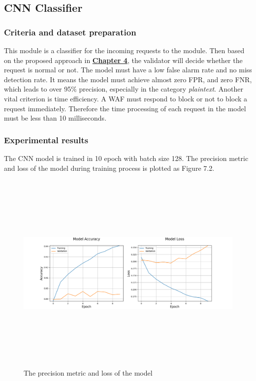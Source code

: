 \subsection{CNN Classifier}
\subsubsection{Criteria and dataset preparation}
\hspace{0.5cm}This module is a classifier for the incoming requests to the module. Then based on the proposed approach in \hyperref[chap:proposed_approaches]{\textbf{Chapter 4}}, the validator will decide whether the request is normal or not. The model must have a low false alarm rate and no miss detection rate. It means the model must achieve almost zero FPR, and zero FNR, which leads to over 95\% precision, especially in the category \textit{plaintext}. Another vital criterion is time efficiency. A WAF must respond to block or not to block a request immediately. Therefore the time processing of each request in the model must be less than 10 milliseconds. 
\subsubsection{Experimental results}
\hspace{0.5cm}The CNN model is trained in 10 epoch with batch size 128. The precision metric and loss of the model during training process is plotted as Figure 7.2.
       
\begin{figure}[!h]
	\centering
	\includegraphics[width=\linewidth, height=10cm,keepaspectratio]{figures/metric and loss.png}
  \caption{The precision metric and loss of the model}  
\end{figure} 

